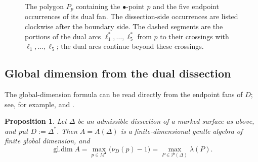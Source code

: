 \documentclass[11pt]{amsart}
\theoremstyle{definition}
\theoremstyle{plain}
\newtheorem{proposition}[proposition]{Proposition}
\theoremstyle{definition}
\theoremstyle{definition}
\newcommand{\gldim}{\operatorname{gl.dim}}
\begin{document}
\begin{figure}[htbp]
\centering
{}
\caption{The polygon $P_p$ containing the $\bullet$-point $p$
and the five endpoint occurrences of its dual fan.
The dissection-side occurrences are listed clockwise after
the boundary side. The dashed segments are the portions
of the dual arcs $\ell_1^*,\ldots,\ell_5^*$ from $p$ to
their crossings with $\ell_1,\ldots,\ell_5$; the dual arcs
continue beyond these crossings.}
\label{fig:elementary-polygon}
\end{figure}

\subsection{Global dimension from the dual dissection}

The global-dimension formula can be read directly from the endpoint fans of
$D$; see, for example, \cite[Theorem~5.10]{LiuGaoHuang} and
\cite[Corollary~2.28]{Chang}.

\begin{proposition}
\label{prop:dual-global-dimension}
Let $\Delta$ be an admissible dissection of a marked surface as above, and
put $D:=\Delta^*$.  Then $A=A(\Delta)$ is a finite-dimensional gentle algebra
of finite global dimension, and
\begin{equation}
\label{eq:surface-global-dimension}
 \gldim A
 =\max_{p\in M^\bullet}\bigl(\nu_D(p)-1\bigr)
 =\max_{P\in\mathcal P(\Delta)}\lambda(P).
\end{equation}
\end{proposition}
\end{document}
